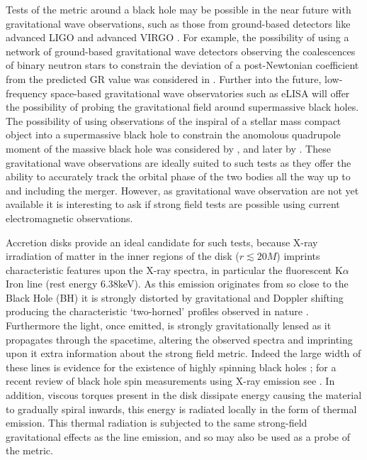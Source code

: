 Tests of the metric around a black hole may be possible in the near future with gravitational wave observations, such as those from ground-based detectors like advanced LIGO and advanced VIRGO \citep{2010CQGra..27h4006H,Acernese2009}. For example, the possibility of using a network of ground-based gravitational wave detectors observing the coalescences of binary neutron stars to constrain the deviation of a post-Newtonian coefficient from the predicted GR value was considered in \cite{2014PhRvD..89h2001A}. Further into the future, low-frequency space-based gravitational wave observatories such as eLISA \citep{TheGravitationalUniverse} will offer the possibility of probing the gravitational field around supermassive black holes. The possibility of using observations of the inspiral of a stellar mass compact object into a supermassive black hole to constrain the anomolous quadrupole moment of the massive black hole was considered by \cite{1997PhRvD..56.1845R}, and later by \cite{2007PhRvD..75d2003B}. These gravitational wave observations are ideally suited to such tests as they offer the ability to accurately track the orbital phase of the two bodies all the way up to and including the merger. However, as gravitational wave observation are not yet available it is interesting to ask if strong field tests are possible using current electromagnetic observations.  

Accretion disks provide an ideal candidate for such tests, because X-ray irradiation of matter in the inner regions of the disk ($r \lesssim 20M$) imprints characteristic features upon the X-ray spectra, in particular the fluorescent K$\alpha$ Iron line (rest energy 6.38keV). As this emission originates from so close to the Black Hole (BH)  it is strongly distorted by gravitational and Doppler shifting producing the characteristic `two-horned' profiles observed in nature \cite{1995Natur.375..659T}. Furthermore the light, once emitted, is strongly gravitationally lensed as it propagates through the spacetime, altering the observed spectra and imprinting upon it extra information about the strong field metric. Indeed the large width of these lines is evidence for the existence of highly spinning black holes \citep{1996MNRAS.279..837I}; for a recent review of black hole spin measurements using X-ray emission see \cite{2011CQGra..28k4009M}. In addition, viscous torques present in the disk dissipate energy causing the material to gradually spiral inwards, this energy is radiated locally in the form of thermal emission. This thermal radiation is subjected to the same strong-field gravitational effects as the line emission, and so may also be used as a probe of the metric. 

